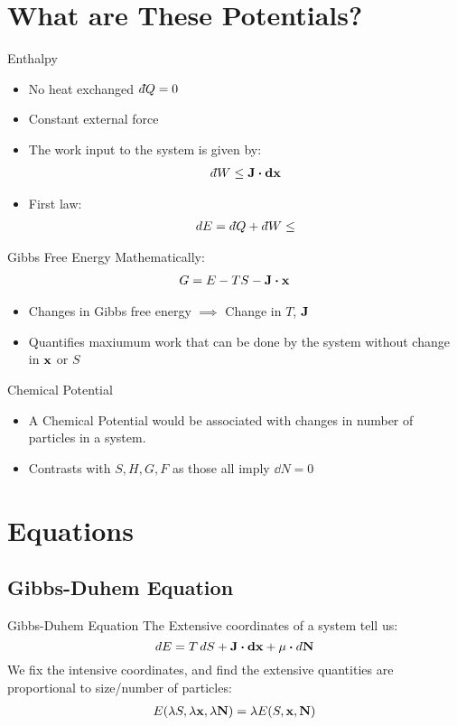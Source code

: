 \documentclass{beamer}
\newcommand{\dbar}{d\hspace*{-0.08em}\bar{}\hspace*{0.1em}}
\begin{document}
\section{What are These Potentials?}
\begin{frame}{Enthalpy}
  \begin{itemize}
  \item No heat exchanged $\dbar Q=0$
  \item Constant external force
  \item The work input to the system is given by:
    \begin{align*}
      \dbar W\leq \vb{J\vdot\dd{x}}
    \end{align*}
  \item First law:
    \begin{align*}
      \dd{E}=\dbar{Q}+\dbar{W}\leq
    \end{align*}
  \end{itemize}
\end{frame}

\begin{frame}{Gibbs Free Energy}
  Mathematically:
  \begin{align*}
    G = E-TS - \vb{J\vdot x}
  \end{align*}
  \begin{itemize}
  \item Changes in Gibbs free energy $\implies$ Change in $T$, $\vb{J}$
  \item Quantifies maxiumum work that can be done by the system without change in $\vb{x}$ or $S$
  \end{itemize}
\end{frame}

\begin{frame}{Chemical Potential}
  \begin{itemize}
  \item A Chemical Potential would be associated with changes in number of particles in a system.
  \item Contrasts with $S,H,G,F$ as those all imply $\dd{N}=0$
  \end{itemize}
\end{frame}

\section{Equations}
\subsection{Gibbs-Duhem Equation}
\begin{frame}{Gibbs-Duhem Equation}
  The Extensive coordinates of a system tell us:
  \begin{equation}\label{eq:1}
    \dd{E}=T\dd{S}+\vb{J\vdot\dd{x}}+\mu\vdot\dd{\vb{N}}
  \end{equation}
  We fix the intensive coordinates, and find the extensive quantities are proportional to size/number of particles:
  \begin{align*}
    E(\lambda S,\lambda\vb{x},\lambda\vb{N})=\lambda E(S,\vb{x},\vb{N})
  \end{align*}
\end{frame}
\end{document}

